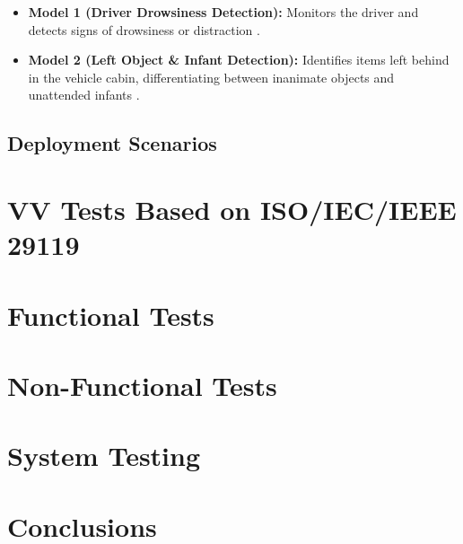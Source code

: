 \begin{itemize}
    \item \textbf{Model 1 (Driver Drowsiness Detection):} Monitors the driver and detects signs of drowsiness or distraction \cite{dataset}. 
    \item \textbf{Model 2 (Left Object \& Infant Detection):} Identifies items left behind in the vehicle cabin, differentiating between inanimate objects and unattended infants \cite{dataset}.
\end{itemize}


\subsection{Deployment Scenarios}\label{subsec:scenarios}

\section{\texorpdfstring{\acrshort{VV}}{VV} Tests Based on \texorpdfstring{\acrshort{ISO}}{ISO}/\texorpdfstring{\acrshort{IEC}}{IEC}/\texorpdfstring{\acrshort{IEEE}}{IEEE} 29119}\label{sec:exp:tests}

\section{Functional Tests}\label{sec:exp:functional}

\section{Non-Functional Tests}\label{sec:exp:non-functional}

\section{System Testing}\label{sec:exp:system}

\section{Conclusions}\label{sec:exp:conclusions}